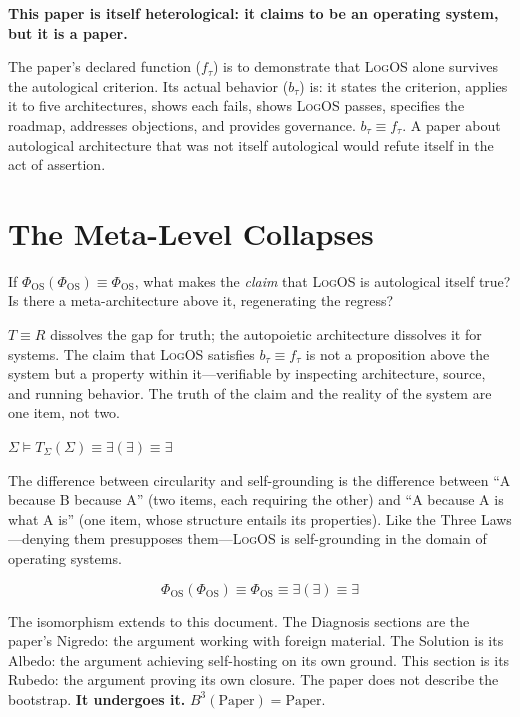 \documentclass[11pt, oneside]{article}
\newcommand{\isolate}[1]{%
    \vspace{8pt}%
    \begin{center}\itshape #1\end{center}%
    \vspace{8pt}%
}
\newcommand{\LogOS}{\textnormal{\textsc{LogOS}}}
\begin{document}
\bigskip
\noindent\textbf{This paper is itself heterological: it claims to be an
operating system, but it is a paper.}

\medskip\noindent
The paper's declared function ($f_\tau$) is to demonstrate that \LogOS{}
alone survives the autological criterion. Its actual behavior ($b_\tau$)
is: it states the criterion, applies it to five architectures, shows
each fails, shows \LogOS{} passes, specifies the roadmap, addresses
objections, and provides governance. $b_\tau \equiv f_\tau$. A paper
about autological architecture that was not itself autological would
refute itself in the act of assertion.

\section{The Meta-Level Collapses}

If $\Phi_{\mathrm{OS}}(\Phi_{\mathrm{OS}}) \equiv \Phi_{\mathrm{OS}}$,
what makes the \textit{claim} that \LogOS{} is autological itself true?
Is there a meta-architecture above it, regenerating the regress?

$T \equiv R$ dissolves the gap for truth; the autopoietic architecture
dissolves it for systems. The claim that \LogOS{} satisfies $b_\tau
\equiv f_\tau$ is not a proposition above the system but a property
within it---verifiable by inspecting architecture, source, and running
behavior. The truth of the claim and the reality of the system are one
item, not two.

\isolate{$\Sigma \models T_\Sigma(\Sigma) \equiv \exists(\exists) \equiv
\exists$}

The difference between circularity and self-grounding is the difference
between ``A because B because A'' (two items, each requiring the other)
and ``A because A is what A is'' (one item, whose structure entails its
properties). Like the Three Laws---denying them presupposes
them---\LogOS{} is self-grounding in the domain of operating systems.

\[
\Phi_{\mathrm{OS}}(\Phi_{\mathrm{OS}}) \equiv \Phi_{\mathrm{OS}}
\equiv \exists(\exists) \equiv \exists
\]

The isomorphism extends to this document. The Diagnosis sections are the
paper's Nigredo: the argument working with foreign material. The Solution
is its Albedo: the argument achieving self-hosting on its own ground.
This section is its Rubedo: the argument proving its own closure. The
paper does not describe the bootstrap. \textbf{It undergoes it.}
$B^{3}(\text{Paper}) = \text{Paper}$.
\end{document}
